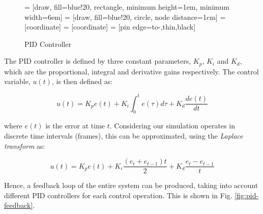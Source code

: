\documentclass{article}
\begin{document}
\begin{figure}[H]
    \centering
     = [draw, fill=blue!20, rectangle, 
    minimum height=1em, minimum width=6em]
     = [draw, fill=blue!20, circle, node distance=1cm]
     = [coordinate]
     = [coordinate]
     = [pin edge={to-,thin,black}]

    \caption{PID Controller}
    \label{fig:pid}
\end{figure}


The PID controller is defined by three constant parameters, $K_p$, $K_i$ and $K_d$, which are the proportional, integral and derivative gains respectively. The control variable, $u(t)$, is then defined as:

$$u(t) = K_p e(t) + K_i \int_0^t e(\tau) d\tau + K_d \frac{de(t)}{dt}$$

where $e(t)$ is the error at time $t$. Considering our simulation operates in discrete time intervals (frames), this can be approximated, using the \emph{Laplace transform} as:

$$u(t) = K_p e(t) + K_i \frac{(e_t+e_{t-1})t}{2} + K_d \frac{e_t-e_{t-1}}{t}$$

Hence, a feedback loop of the entire system can be produced, taking into account different PID controllers for each control operation. This is shown in Fig. \ref{fig:pid-feedback}.
\end{document}
